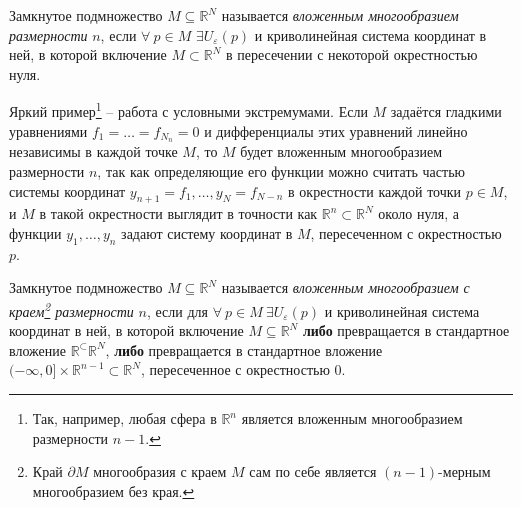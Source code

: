 \begin{to_def} 
    Замкнутое подмножество $M \subseteq \mathbb{R}^N$ называется \textit{вложенным многообразием размерности} $n$, если $\forall \ p \in M$ $\exists U_{\varepsilon}(p)$ и криволинейная система координат в ней, в которой включение $M \subset \mathbb{R}^N$ в пересечении с некоторой окрестностью нуля.
\end{to_def}

Яркий пример\footnote{
    Так, например, любая сфера в $\mathbb{R}^n$ является вложенным многообразием размерности $n-1$.
} -- работа с условными экстремумами. Если $M$ задаётся гладкими уравнениями $f_1 = \ldots = f_{N_n} = 0$ и дифференциалы этих уравнений линейно независимы в каждой точке $M$, то $M$ будет вложенным многообразием размерности $n$, так как определяющие его функции можно считать частью системы координат $y_{n+1}=f_1,\ldots,y_N=f_{N-n}$ в окрестности каждой точки $p \in M$, и $M$ в такой окрестности выглядит в точности как $\mathbb{R}^n \subset \mathbb{R}^N$ около нуля, а функции $y_1,\ldots,y_n$ задают систему координат в $M$, пересеченном с окрестностью $p$.


\begin{to_def} 
    Замкнутое подмножество $M \subseteq \mathbb{R}^N$ называется \textit{вложенным многообразием с краем\footnote{
        Край $\partial M$ многообразия с краем $M$ сам по себе является $(n-1)$-мерным многообразием без края.
    } размерности} $n$, если для $\forall \ p \in M \ \exists U_{\varepsilon}(p)$ и криволинейная система координат в ней, в которой включение $M \subseteq \mathbb{R}^N$ \textbf{либо} превращается в стандартное вложение $\mathbb{R}^ \subset \mathbb{R}^N$, \textbf{либо} превращается в стандартное вложение $(-\infty, 0] \times \mathbb{R}^{n-1} \subset \mathbb{R}^N$, пересеченное с окрестностью 0.
\end{to_def}